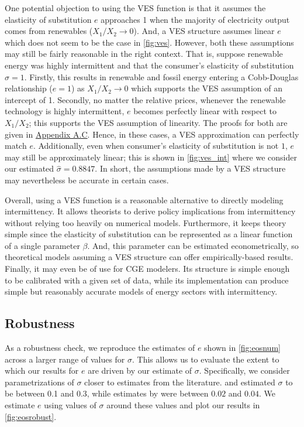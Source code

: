 \documentclass[11pt,a4paper,leqno]{extarticle}
\begin{document}
	
	One potential objection to using the VES function is that it assumes the elasticity of substitution $e$ approaches 1 when the majority of electricity output comes from renewables ($X_1/X_2 \to 0$). And, a VES structure assumes linear $e$ which does not seem to be the case in \autoref{fig:ves}. However, both these assumptions may still be fairly reasonable in the right context. That is, suppose renewable energy was highly intermittent and that the consumer's elasticity of substitution $\sigma = 1$. Firstly, this results in renewable  and fossil energy entering a Cobb-Douglas relationship ($e = 1$) as $X_1/X_2 \to 0$ which supports the VES assumption of an intercept of 1. Secondly, no matter the relative prices, whenever the renewable technology is highly intermittent, $e$ becomes perfectly linear with respect to $X_1/X_2$; this supports the VES assumption of linearity. The proofs for both are given in \hyperref[sec:asympeos]{Appendix A.C}. Hence, in these cases, a VES approximation  can perfectly match $e$. Additionally, even when consumer's elasticity of substitution is not $1$, $e$ may still be approximately linear; this is shown in \autoref{fig:ves_int} where we consider our estimated $\hat{\sigma} = 0.8847$. In short, the assumptions made by a VES structure may nevertheless be accurate in certain cases. 
	
	
	
	Overall, using a VES function is a reasonable alternative to directly modeling intermittency. It allows theorists to derive policy implications from intermittency without relying too heavily on numerical models. Furthermore, it keeps theory simple since the elasticity of substitution can be represented as a linear function of a single parameter $\beta$. And, this parameter can be estimated econometrically, so theoretical models assuming a VES structure can offer empirically-based results. Finally, it may even be of use for CGE modelers. Its structure is simple enough to be calibrated with a given set of data, while its implementation can produce simple but reasonably accurate models of energy sectors with intermittency. 
	
	\subsection{Robustness}
	
	As a robustness check, we reproduce the estimates of $e$ shown in \autoref{fig:eosnum} across a larger range of values for $\sigma$. This allows us to  evaluate the extent to which our results for $e$ are driven by our estimate of $\sigma$. Specifically, we consider parametrizations of $\sigma$ closer to estimates from the literature. \citet{Herriges} and \citet{KS1994} estimated $\sigma$ to be between 0.1 and 0.3, while estimates by \citet{Schwarz} were between $0.02$ and $0.04$. We estimate $e$ using values of $\sigma$ around these values and plot our results in  \autoref{fig:eosrobust}. 
	
\end{document}

